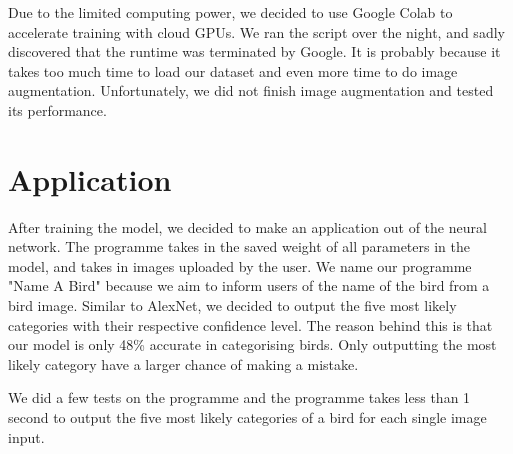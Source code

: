 \documentclass[letterpaper, 12pt]{article}
\begin{document}
Due to the limited computing power, we decided to use Google Colab to accelerate training with cloud GPUs. We ran the script over the night, and sadly discovered
that the runtime was terminated by Google. It is probably because it takes too much time to load our dataset and even more time to do image augmentation. Unfortunately,
we did not finish image augmentation and tested its performance.

\section{Application}
After training the model, we decided to make an application out of the neural network. The programme takes in the saved weight of all parameters in the model, and
takes in images uploaded by the user. We name our programme "Name A Bird" because we aim to inform users of the name of the bird from a bird image. Similar to AlexNet,
we decided to output the five most likely categories with their respective confidence level. The reason behind this is that our model is only 48\% accurate in
categorising birds. Only outputting the most likely category have a larger chance of making a mistake.

We did a few tests on the programme and the programme takes less than 1 second to output the five most likely categories of a bird for each single image input.



\end{document}
